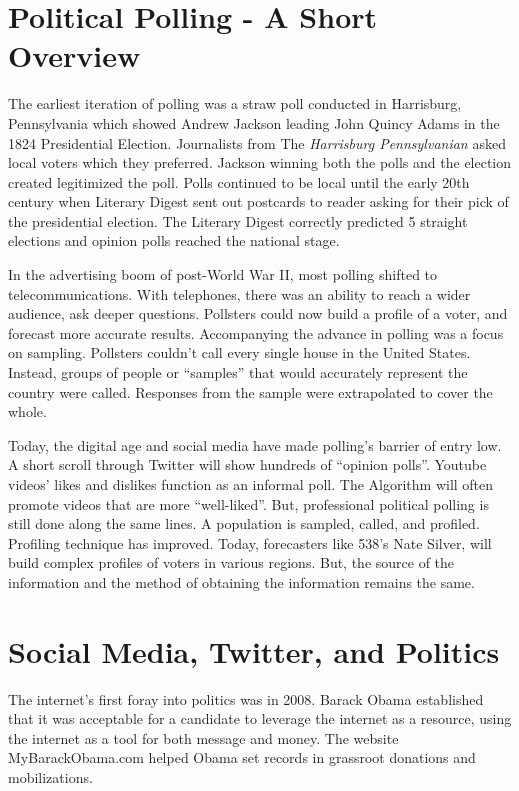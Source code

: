 \documentclass[11pt, twoside, reqno]{book}
\begin{document}
\section{Political Polling - A Short Overview}
\hspace{0.2in} The earliest iteration of polling was a straw poll conducted in Harrisburg, Pennsylvania which showed Andrew Jackson leading John Quincy Adams in the 1824 Presidential Election. Journalists from The \textit{Harrisburg Pennsylvanian} asked local voters which they preferred. Jackson winning both the polls and the election created legitimized the poll. Polls continued to be local until the early 20th century when Literary Digest sent out postcards to reader asking for their pick of the presidential election. The Literary Digest correctly predicted 5 straight elections and opinion polls reached the national stage. 

In the advertising boom of post-World War II, most polling shifted to telecommunications. With telephones, there was an ability to reach a wider audience, ask deeper questions. Pollsters could now build a profile of a voter, and forecast more accurate results. Accompanying the advance in polling was a focus on sampling. Pollsters couldn’t call every single house in the United States. Instead, groups of people or “samples” that would accurately represent the country were called. Responses from the sample were extrapolated to cover the whole. 

Today, the digital age and social media have made polling’s barrier of entry low. A short scroll through Twitter will show hundreds of “opinion polls”. Youtube videos’ likes and dislikes function as an informal poll. The Algorithm will often promote videos that are more “well-liked”. But, professional political polling is still done along the same lines. A population is sampled, called, and profiled. Profiling technique has improved. Today, forecasters like 538’s Nate Silver, will build complex profiles of voters in various regions. But, the source of the information and the method of obtaining the information remains the same. 

\section{Social Media, Twitter, and Politics}
\hspace{0.2in}The internet’s first foray into politics was in 2008. Barack Obama established that it was acceptable for a candidate to leverage the internet as a resource, using the internet as a tool for both message and money. The website MyBarackObama.com helped Obama set records in grassroot donations and mobilizations. 
\end{document}
